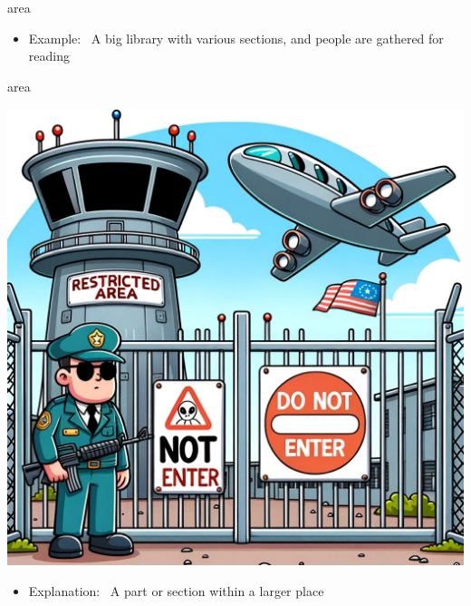 \documentclass[avery5371, grid,frame]{flashcards}
\begin{document}
\begin{flashcard}{area}
\begin{center}
\begin{minipage}[c]{.45\textwidth}
\begin{itemize}
            \item Example: \ A big library with various sections, and people are gathered for reading
            \end{itemize}
        \end{minipage}
    \end{center}
    \vspace*{\fill}
\end{flashcard}\begin{flashcard}{area}
    \vspace*{\fill}
    \begin{center}
        \begin{minipage}[c]{.45\textwidth}
            \includegraphics[width=\textwidth]{cards/a/area/area - a restricted zone with a 'Do Not Enter' sign and a guarded gate.png}
        \end{minipage}
        \begin{minipage}[c]{.45\textwidth}
            \begin{itemize}\setlength\itemsep{12pt}
            \item Explanation: \ A part or section within a larger place


\end{itemize}
\end{minipage}
\end{center}
\end{flashcard}
\end{document}
